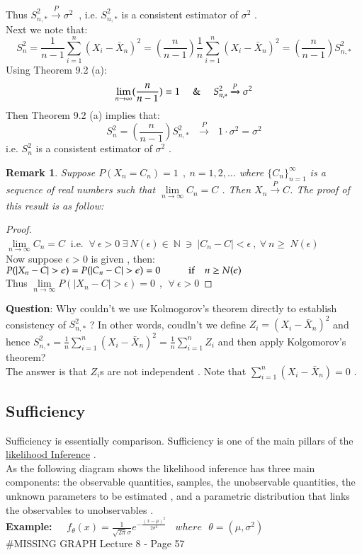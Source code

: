 \documentclass[14pt,twoside,a4paper,fleqn]{article}
\theoremstyle{plain}
\newtheorem*{remark*}{Remark}
\begin{document}
Thus $S^2_{n,*} \xrightarrow{P}\sigma^2\ $ , i.e. $S^2_{n,*}$ is a consistent estimator of $\sigma^2$ .\\
Next we note that:\\
$$
	S^2_n = \frac{1}{n-1}\sum_{i=1}^n (X_i-\bar{X}_n)^2 = (\frac{n}{n-1})\frac{1}{n}\sum_{i=1}^n (X_i - \bar{X}_n)^2 = (\frac{n}{n-1})S^2_{n,*}
$$ 
Using Theorem 9.2 (a):
$$
	\lim\limits_{n\to\infty} (\frac{n}{n-1}) = 1 \ \ \ \And\ \ \  S^2_{n,*} \xrightarrow{P} \sigma^2
$$
Then Theorem 9.2 (a) implies that:
$$
	S^2_n = (\frac{n}{n-1})S^2_{n,*}\ \ \ \xrightarrow{P}\ \ \ 1\cdot\sigma^2 = \sigma^2
$$
i.e. $S^2_n$ is a consistent estimator of $\sigma^2$ . 
\begin{remark*}
Suppose $P(X_n=C_n)=1\ \ ,\ n=1,2,\ldots$ where $\big\{C_n\big\}_{n=1}^{\infty}$ is a sequence of real numbers such that $\lim\limits_{n\to\infty} C_n = C$ . Then $X_n\xrightarrow{P}C$. The proof of this result is as follow:
\end{remark*}
\begin{proof}\hfill\\
	$\lim\limits_{n\to\infty} C_n = C\ $ i.e. $\ \forall\ \epsilon>0 \ \exists \ N(\epsilon) \in\ \mathbb{N} \ \ni\ \vert C_n - C\vert < \epsilon\ ,\ \forall\ n\geq\ N(\epsilon)$\\
	Now suppose $\epsilon > 0$ is given , then:\\
	$P(\vert X_n - C\vert > \epsilon) = P(\vert C_n - C\vert > \epsilon) = 0\hspace*{1cm} \text{if $\ \ \ n\geq N(\epsilon)$}$\\
	Thus $\lim\limits_{n\to\infty} P(\vert X_n - C\vert > \epsilon)=0\ \ ,\ \ \forall\ \epsilon>0$
\end{proof}
\textbf{Question}: Why couldn't we use Kolmogorov's theorem directly to establish consistency of $S^2_{n,*}$ ? In other words, coudln't we define \mbox{$Z_i = (X_i - \bar{X}_n)^2$} and hence \mbox{$S^2_{n,*} = \frac{1}{n}\sum_{i=1}^n (X_i - \bar{X}_n)^2 = \frac{1}{n}\sum_{i=1}^n Z_i$} and then apply Kolgomorov's \mbox{theorem?}\\
The answer is that $Z_i$s are not independent . Note that \mbox{$\sum_{i=1}^n (X_i-\bar{X}_n)=0$} .
\subsection{Sufficiency}
Sufficiency is essentially comparison. Sufficiency is one of the main pillars of the \underline{likelihood Inference} .\\
As the following diagram shows the likelihood inference has three main components: the observable quantities, samples, the unobservable quantities, the unknown parameters to be estimated , and a parametric distribution that links the observables to unobservables .\\
\textbf{Example:\ \ } $f_{\theta}(x) = \frac{1}{\sqrt{2\pi}\sigma}e^{-\frac{(x-\mu)^2}{2\sigma^2}}\ \ \ \ where \ \ \ \theta = (\mu, \sigma^2)
$\\
\#MISSING GRAPH Lecture 8 - Page 57
\end{document}
